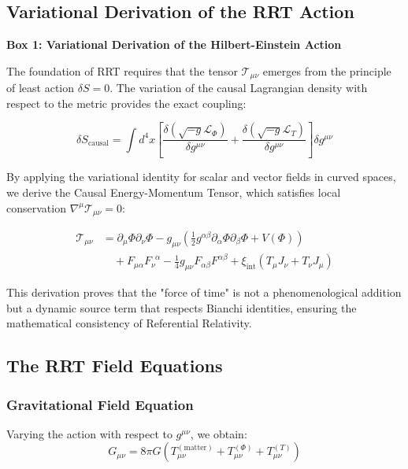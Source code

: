 \documentclass[12pt,a4paper]{article}
\begin{document}
\subsection{Variational Derivation of the RRT Action}
\label{sec:variational_derivation}

\begin{framed}
\centering
\textbf{Box 1: Variational Derivation of the Hilbert-Einstein Action}
\end{framed}

The foundation of RRT requires that the tensor $\mathcal{T}_{\mu\nu}$ emerges from the principle of least action $\delta S = 0$. The variation of the causal Lagrangian density with respect to the metric provides the exact coupling:

\begin{equation}
    \delta S_{\text{causal}} = \int d^4x \left[ \frac{\delta(\sqrt{-g}\mathcal{L}_\Phi)}{\delta g^{\mu\nu}} + \frac{\delta(\sqrt{-g}\mathcal{L}_T)}{\delta g^{\mu\nu}} \right] \delta g^{\mu\nu}
\end{equation}

By applying the variational identity for scalar and vector fields in curved spaces, we derive the Causal Energy-Momentum Tensor, which satisfies local conservation $\nabla^\mu \mathcal{T}_{\mu\nu} = 0$:

\begin{align}
    \mathcal{T}_{\mu\nu} &= \partial_\mu \Phi \partial_\nu \Phi - g_{\mu\nu} \left( \frac{1}{2} g^{\alpha\beta} \partial_\alpha \Phi \partial_\beta \Phi + V(\Phi) \right) \nonumber \\
    &\quad + F_{\mu\alpha} F_\nu^{\phantom{\nu}\alpha} - \frac{1}{4} g_{\mu\nu} F_{\alpha\beta} F^{\alpha\beta} + \xi_{\text{int}} (T_\mu J_\nu + T_\nu J_\mu)
\end{align}

This derivation proves that the "force of time" is not a phenomenological addition but a dynamic source term that respects Bianchi identities, ensuring the mathematical consistency of Referential Relativity.

\subsection{The RRT Field Equations}

\subsubsection{Gravitational Field Equation}
Varying the action with respect to $g^{\mu\nu}$, we obtain:
\begin{equation}
    G_{\mu\nu} = 8\pi G \left( T^{(\text{matter})}_{\mu\nu} + T^{(\Phi)}_{\mu\nu} + T^{(T)}_{\mu\nu} \right)
\end{equation}
\end{document}
